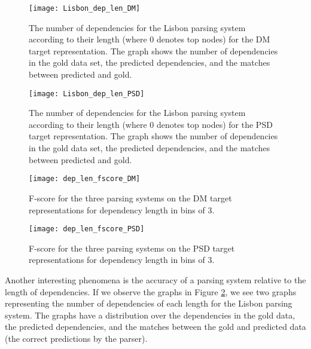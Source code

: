 \begin{figure}[h]
    \centering
    \begin{minipage}{0.8\textwidth}
        \centering
        \texttt{[image: Lisbon\_dep\_len\_DM]}
    \end{minipage}\hfill
    \caption{The number of dependencies for the Lisbon parsing system according to their length (where 0 denotes top nodes) for the DM target representation. The graph shows the number of dependencies in the gold data set, the predicted dependencies, and the matches between predicted and gold.}
    \label{fig:Lisbon_dep_len_DM}
\end{figure}

\begin{figure}[h]
    \centering
    \begin{minipage}{0.8\textwidth}
        \centering
        \texttt{[image: Lisbon\_dep\_len\_PSD]}
    \end{minipage}
    \caption{The number of dependencies for the Lisbon parsing system according to their length (where 0 denotes top nodes) for the PSD target representation. The graph shows the number of dependencies in the gold data set, the predicted dependencies, and the matches between predicted and gold.}
    \label{fig:Lisbon_dep_len_DM}
\end{figure}

\begin{figure}[h]
    \centering
    \begin{minipage}{0.8\textwidth}
        \centering
        \texttt{[image: dep\_len\_fscore\_DM]}
    \end{minipage}\hfill
    \caption{F-score for the three parsing systems on the DM target representations for dependency length in bins of 3.}
    \label{fig:dep_len_fscore}
\end{figure}

\begin{figure}[h]
    \centering
    \begin{minipage}{0.8\textwidth}
        \centering
        \texttt{[image: dep\_len\_fscore\_PSD]}
    \end{minipage}
    \caption{F-score for the three parsing systems on the PSD target representations for dependency length in bins of 3.}
    \label{fig:dep_len_fscore}
\end{figure}

Another interesting phenomena is the accuracy of a parsing system relative to the length of dependencies. If we observe the graphs in Figure \ref{fig:Lisbon_dep_len_DM}, we see two graphs representing the number of dependencies of each length for the Lisbon parsing system. The graphs have a distribution over the dependencies in the gold data, the predicted dependencies, and the matches between the gold and predicted data (the correct predictions by the parser).

